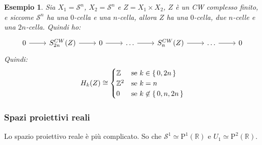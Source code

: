 \documentclass[10pt, twoside=false, x11names]{scrbook}
\newtheorem{example}[theorem]{Esempio}
\newcommand{\Z}{\mathbb{Z}}
\newcommand{\Pjr}[1]{\mathrm{P}^#1 (\mathbb{R})}
\newcommand{\Sph}[1][]{\mathcal{S}^#1}
\begin{document}
\begin{example}
  Sia $ X_1 = \Sph{n} $, $ X_2 = \Sph{n} $ e $ Z = X_1 \times X_2 $, $ Z $ è un CW
  complesso finito, e siccome $ \Sph{n} $ ha una $ 0 $-cella e una $ n $-cella,
  allora $ Z $ ha una $ 0 $-cella, due $ n $-celle e una $ 2n $-cella.
  Quindi ho:
  \[
    \begin{tikzcd}
      0 \rar & S_{2n}^{CW}(Z) \rar & 0 \rar & \dots \rar & S_n^{CW}(Z) \rar & \dots \rar & 0
    \end{tikzcd}
  \]
  Quindi:
  \[
    H_k(Z) \cong
    \begin{cases}
      \Z & \text{se } k \in \set{0, 2n} \\
      \Z^2 & \text{se } k = n \\
      0 & \text{se } k \not \in \set{0, n, 2n}
    \end{cases}
  \]
\end{example}

\subsubsection{Spazi proiettivi reali}
Lo spazio proiettivo reale è più complicato. So che
$ \Sph{1} \simeq \Pjr{1} $ e $ U_1 \simeq \Pjr{2} $.
\end{document}
